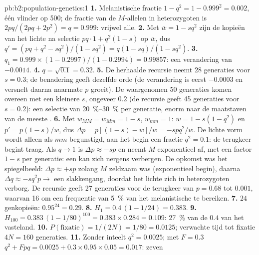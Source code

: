 \begin{solution}{pb:b2:population-genetics:1}
\textbf{1.} Melanistische fractie $1 - q^{2} = 1 - 0.999^{2} = 0.002$,
één vlinder op 500; de fractie van de $M$-allelen in heterozygoten is
$2pq/(2pq + 2p^{2}) = q = 0.999$: vrijwel alle.
\textbf{2.} Met $\bar w = 1 - sq^{2}$ zijn de kopieën van het lichte 
na selectie $pq\cdot 1 + q^{2}(1 - s)$ op $\bar w$, dus $q'
= (pq + q^{2} - sq^{2})/(1 - sq^{2}) = q(1 - sq)/(1 - sq^{2})$.
\textbf{3.} $q_1 = 0.999\times(1 - 0.2997)/(1 - 0.2994) = 0.99857$:
een verandering van $-0.0014$.
\textbf{4.} $q = \sqrt{0.1} = 0.32$.
\textbf{5.} De herhaalde recursie neemt 28 generaties voor $s =
0.3$; de benadering geeft dezelfde orde (de verandering is eerst
$-0.0003$ en versnelt daarna naarmate $p$ groeit). De waargenomen 50
generaties komen overeen met een kleinere $s$, ongeveer $0.2$ (de recursie
geeft 45 generaties voor $s = 0.2$): een selectie van \qtyrange{20}{30}{\%}
per generatie, enorm naar de maatstaven van de meeste .
\textbf{6.} Met $w_{MM} = w_{Mm} = 1 - s$, $w_{mm} = 1$: $\bar w = 1
- s(1 - q^{2})$ en $p' = p(1 - s)/\bar w$, dus $\Delta p = p[(1 - s) -
\bar w]/\bar w = -spq^{2}/\bar w$. De lichte vorm wordt alleen als
 $mm$ begunstigd, aan het begin een fractie $q^{2} = 0.1$: de
terugkeer begint traag. Als $q \to 1$ is $\Delta p \approx -sp$ en neemt $M$
exponentieel af, met een factor $1 - s$ per generatie: een
  kan zich nergens verbergen. De opkomst was het spiegelbeeld:
$\Delta p \approx +sp$ zolang $M$ zeldzaam was (exponentieel begin), daarna
$\Delta q \approx -sq^{2}p \to$ een slakkengang, doordat het lichte  zich
in heterozygoten verborg. De recursie geeft 27 generaties voor de terugkeer
van $p = 0.68$ tot $0.001$, waarvan 16 om een frequentie van \qty{5}{\%} van
het melanistische  te bereiken.
\textbf{7.} $24$ genkopieën: $0.95^{24} = 0.29$.
\textbf{8.} $H_1 = 0.4\,(1 - 1/24) = 0.383$.
\textbf{9.} $H_{100} = 0.383\,(1 - 1/80)^{100} = 0.383\times 0.284 =
0.109$: \qty{27}{\%} van de $0.4$ van het vasteland.
\textbf{10.} $P(\text{fixatie}) = 1/(2N) = 1/80 = 0.0125$; verwachte
tijd tot fixatie $4N = 160$ generaties.
\textbf{11.} Zonder inteelt $q^{2} = 0.0025$; met $F = 0.3$
$q^{2} + Fpq = 0.0025 + 0.3\times 0.95\times 0.05 = 0.017$: zeven

\end{solution}
